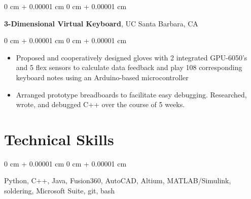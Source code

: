\documentclass[10pt, letterpaper]{article}
\newenvironment{highlights}{
    \begin{itemize}[
        topsep=0.10 cm,
        parsep=0.10 cm,
        partopsep=0pt,
        itemsep=0pt,
        leftmargin=0 cm + 10pt
    ]
}{
    \end{itemize}
} %
\newenvironment{onecolentry}{
    \begin{adjustwidth}{
        0 cm + 0.00001 cm
    }{
        0 cm + 0.00001 cm
    }
}{
    \end{adjustwidth}
} %
\newenvironment{twocolentry}[2][]{
    \onecolentry
    \def\secondColumn{#2}
    \setcolumnwidth{\fill, 4.5 cm}
    \begin{paracol}{2}
}{
    \switchcolumn \raggedleft \secondColumn
    \end{paracol}
    \endonecolentry
} %
\begin{document}
        
        \begin{twocolentry}{
    
        }
            \textbf{3-Dimensional Virtual Keyboard}, UC Santa Barbara, CA\end{twocolentry}

        \vspace{0.10 cm}
        \begin{onecolentry}
            \begin{highlights}
                \item Proposed and cooperatively designed gloves with 2 integrated GPU-6050's and 5 flex sensors to calculate data feedback and play
                108 corresponding keyboard notes using an Arduino-based microcontroller
                \item Arranged prototype breadboards to facilitate easy debugging. Researched, wrote, and debugged C++ over the
                course of 5 weeks.
            \end{highlights}
        \end{onecolentry}
    
    \section{Technical Skills}

        \begin{onecolentry}
            \item Python, C++, Java, Fusion360, AutoCAD, Altium, MATLAB/Simulink, soldering, Microsoft Suite, git, bash
        \end{onecolentry}
\end{document}
